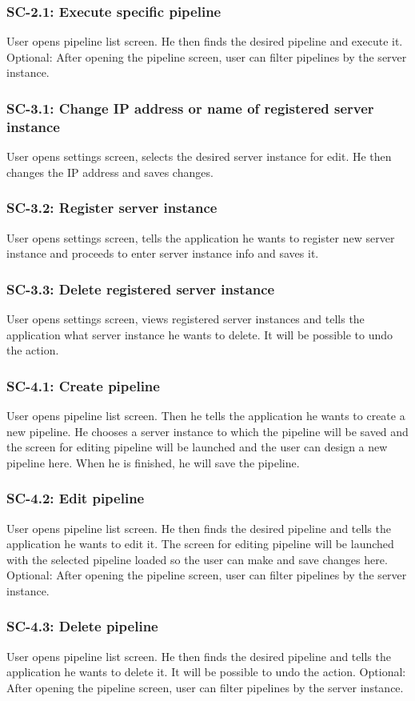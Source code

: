 \subsubsection*{SC-2.1: Execute specific pipeline}
User opens pipeline list screen. He then finds the desired pipeline and execute it. Optional: After opening the pipeline screen, user can filter pipelines by the server instance.
\subsubsection*{SC-3.1: Change IP address or name of registered server instance}
User opens settings screen, selects the desired server instance for edit. He then changes the IP address and saves changes.
\subsubsection*{SC-3.2: Register server instance}
User opens settings screen, tells the application he wants to register new server instance and proceeds to enter server instance info and saves it.
\subsubsection*{SC-3.3: Delete registered server instance}
User opens settings screen, views registered server instances and tells the application what server instance he wants to delete. It will be possible to undo the action.
\subsubsection*{SC-4.1: Create pipeline}
User opens pipeline list screen. Then he tells the application he wants to create a new pipeline. He chooses a server instance to which the pipeline will be saved and the screen for editing pipeline will be launched and the user can design a new pipeline here. When he is finished, he will save the pipeline.
\subsubsection*{SC-4.2: Edit pipeline}
User opens pipeline list screen. He then finds the desired pipeline and tells the application he wants to edit it. The screen for editing pipeline will be launched with the selected pipeline loaded so the user can make and save changes here. Optional: After opening the pipeline screen, user can filter pipelines by the server instance.
\subsubsection*{SC-4.3: Delete pipeline}
User opens pipeline list screen. He then finds the desired pipeline and tells the application he wants to delete it. It will be possible to undo the action. Optional: After opening the pipeline screen, user can filter pipelines by the server instance.
